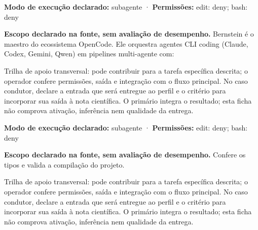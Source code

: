 \begin{arquitetura}
\textbf{Modo de execução declarado:} subagente · \textbf{Permissões:} edit: deny; bash: deny
\end{arquitetura}


\begin{descricao}
\textbf{Escopo declarado na fonte, sem avaliação de desempenho.}
Bernstein é o maestro do ecossistema OpenCode. Ele orquestra agentes CLI coding (Claude, Codex, Gemini, Qwen) em pipelines multi-agente com:
\end{descricao}

\begin{funcao}
Trilha de apoio transversal: pode contribuir para a tarefa específica descrita; o operador confere permissões, saída e integração com o fluxo principal. No caso condutor, declare a entrada que será entregue ao perfil e o critério para incorporar sua saída à nota científica. O primário integra o resultado; esta ficha não comprova ativação, inferência nem qualidade da entrega.
\end{funcao}

\begin{arquitetura}
\textbf{Modo de execução declarado:} subagente · \textbf{Permissões:} edit: deny; bash: deny
\end{arquitetura}


\begin{descricao}
\textbf{Escopo declarado na fonte, sem avaliação de desempenho.}
Confere os tipos e valida a compilação do projeto.
\end{descricao}

\begin{funcao}
Trilha de apoio transversal: pode contribuir para a tarefa específica descrita; o operador confere permissões, saída e integração com o fluxo principal. No caso condutor, declare a entrada que será entregue ao perfil e o critério para incorporar sua saída à nota científica. O primário integra o resultado; esta ficha não comprova ativação, inferência nem qualidade da entrega.
\end{funcao}

